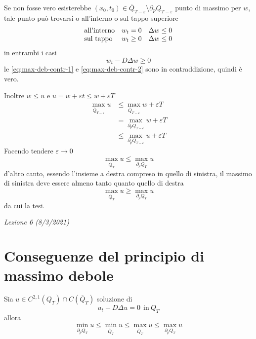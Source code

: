 \documentclass[10pt,a4paper,twoside,openright]{book}
\begin{document}
\begin{dimostrazione}
Se non fosse vero esisterebbe $(x_{0},t_{0}) \in \overline{Q}_{T-\varepsilon } \setminus \partial _{p} Q_{T-\varepsilon }$ punto di massimo per $w$, tale punto può trovarsi o all'interno o sul tappo superiore
\begin{equation*}
\begin{array}{ l l l }
\text{all'interno} & w_{t} =0 & \Delta w\leqslant 0\\
\text{sul tappo} & w_{t} \geqslant 0 & \Delta w\leqslant 0
\end{array}
\end{equation*}
in entrambi i casi
\begin{equation}
w_{t} -D\Delta w\geqslant 0
\label{eq:max-deb-contr-2}
\end{equation}
le \eqref{eq:max-deb-contr-1} e \eqref{eq:max-deb-contr-2} sono in contraddizione, quindi è vero.

Inoltre $w\leqslant u$ e $u=w+\varepsilon t\leqslant w+\varepsilon T$
\begin{align*}
\max_{\overline{Q}_{T-\varepsilon }} u & \leqslant \max_{\overline{Q}_{T-\varepsilon }} w+\varepsilon T\\
 & =\max_{\partial _{p} Q_{T-\varepsilon }} w+\varepsilon T\\
 & \leqslant \max_{\partial _{p} Q_{T-\varepsilon }} u+\varepsilon T
\end{align*}
Facendo tendere $\varepsilon \rightarrow 0$
\begin{equation*}
\max_{\overline{Q}_{T}} u\leqslant \max_{\partial _{p} Q_{T}} u
\end{equation*}
d'altro canto, essendo l'insieme a destra compreso in quello di sinistra, il massimo di sinistra deve essere almeno tanto quanto quello di destra
\begin{equation*}
\max_{\overline{Q}_{T}} u\geqslant \max_{\partial _{p} Q_{T}} u
\end{equation*}
da cui la tesi.
\end{dimostrazione}
\textit{Lezione 6 (8/3/2021)}
\section{Conseguenze del principio di massimo debole}

Sia $u\in C^{2,1}(Q_{T}) \cap C(\overline{Q}_{T})$ soluzione di
\begin{equation*}
u_{t} -D\Delta u=0\ \ \text{in} \ Q_{T}
\end{equation*}
allora
\begin{equation*}
\min_{\partial _{p} Q_{T}} u\leqslant \min_{\overline{Q}_{T}} u\leqslant \max_{\overline{Q}_{T}} u\leqslant \max_{\partial _{p} Q_{T}} u
\end{equation*}
\end{document}
